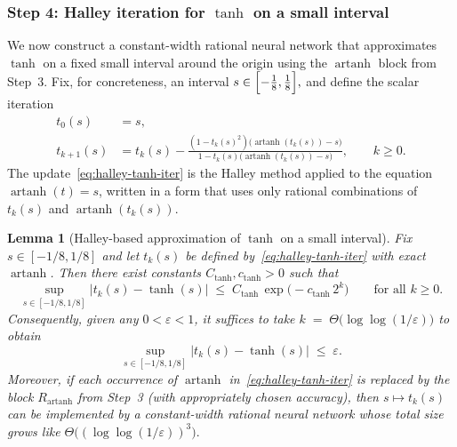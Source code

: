 \documentclass{article}
\theoremstyle{plain}
\newtheorem{lemma}[theorem]{Lemma}
\theoremstyle{definition}
\theoremstyle{remark}
\begin{document}
\subsubsection*{Step 4: Halley iteration for $\tanh$ on a small interval}

We now construct a constant-width rational neural network that approximates $\tanh$ on a fixed small interval around the origin using the $\operatorname{artanh}$ block from Step~3. Fix, for concreteness, an interval \(
s\in\Bigl[-\tfrac{1}{8},\tfrac{1}{8}\Bigr],
\) and define the scalar iteration
\begin{equation}
\label{eq:halley-tanh-iter}
\begin{aligned}
t_0(s) &= s,\\[0.25em]
t_{k+1}(s)
&=
t_k(s)
-
\frac{(1-t_k(s)^2)\bigl(\operatorname{artanh}(t_k(s))-s\bigr)}{1-t_k(s)\bigl(\operatorname{artanh}(t_k(s))-s\bigr)},
\qquad k\ge 0.
\end{aligned}
\end{equation}
The update~\cref{eq:halley-tanh-iter} is the Halley method applied to the equation $\operatorname{artanh}(t)=s$, written in a form that uses only rational combinations of $t_k(s)$ and $\operatorname{artanh}(t_k(s))$.

\begin{lemma}[Halley-based approximation of $\tanh$ on a small interval]
\label{lem:halley-tanh}
Fix $s\in[-1/8,1/8]$ and let $t_k(s)$ be defined by~\cref{eq:halley-tanh-iter} with exact $\operatorname{artanh}$. Then there exist constants $C_{\tanh},c_{\tanh}>0$ such that
\[
\sup_{s\in[-1/8,1/8]}
\bigl|t_k(s)-\tanh(s)\bigr|
\;\le\;
C_{\tanh}\,\exp\!\bigl(-c_{\tanh}\,2^k\bigr)
\qquad\text{for all }k\ge 0.
\]
Consequently, given any $0<\varepsilon<1$, it suffices to take \(
k \;=\; \Theta\!\bigl(\log\log(1/\varepsilon)\bigr)
\)
to obtain
\[
\sup_{s\in[-1/8,1/8]}
\bigl|t_k(s)-\tanh(s)\bigr|
\;\le\;\varepsilon.
\]
Moreover, if each occurrence of $\operatorname{artanh}$ in~\cref{eq:halley-tanh-iter} is replaced by the block $R_{\operatorname{artanh}}$ from Step~3 (with appropriately chosen accuracy), then $s\mapsto t_k(s)$ can be implemented by a constant-width rational neural network whose total size grows like \(
\Theta\!\bigl((\log\log(1/\varepsilon))^3\bigr).
\)
\end{lemma}
\end{document}
